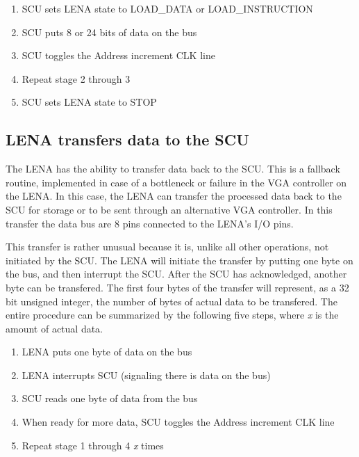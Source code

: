 \begin{enumerate}
\item SCU sets LENA state to LOAD\_DATA or LOAD\_INSTRUCTION
\item SCU puts 8 or 24 bits of data on the bus
\item SCU toggles the Address increment CLK line
\item Repeat stage 2 through 3
\item SCU sets LENA state to STOP
\end{enumerate}

\subsection{LENA transfers data to the SCU}
The LENA has the ability to transfer data back to the SCU. This is a fallback routine, implemented in case of a bottleneck or failure in the VGA controller on the LENA. In this case, the LENA can transfer the processed data back to the SCU for storage or to be sent through an alternative VGA controller. In this transfer the data bus are 8 pins connected to the LENA's I/O pins.

This transfer is rather unusual because it is, unlike all other operations, not initiated by the SCU. The LENA will initiate the transfer by putting one byte on the bus, and then interrupt the SCU. After the SCU has acknowledged, another byte can be transfered. The first four bytes of the transfer will represent, as a 32 bit unsigned integer, the number of bytes of actual data to be transfered. The entire procedure can be summarized by the following five steps, where \emph{x} is the amount of actual data.

\begin{enumerate}
\item LENA puts one byte of data on the bus
\item LENA interrupts SCU (signaling there is data on the bus)
\item SCU reads one byte of data from the bus
\item When ready for more data, SCU toggles the Address increment CLK line
\item Repeat stage 1 through 4 \emph{x} times
\end{enumerate}


